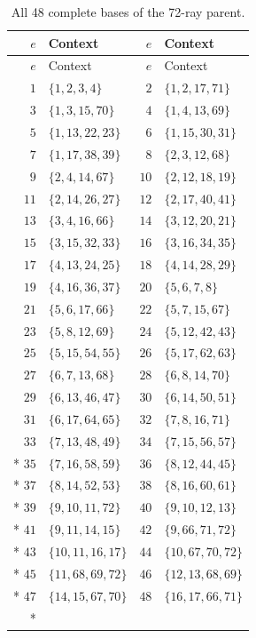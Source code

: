 \documentclass[aps,pra,reprint,superscriptaddress,longbibliography,nofootinbib,floatfix,10pt]{revtex4-2}
\theoremstyle{definition}
\begin{document}
\begin{longtable}{rlrl}
\caption{All 48 complete bases of the 72-ray parent.}\label{tab:parent72-contexts}\\
\toprule
$e$ & Context & $e$ & Context\\\midrule
\endfirsthead
\toprule
$e$ & Context & $e$ & Context\\\midrule
\endhead
\bottomrule\endfoot
$1$ & $\{1,2,3,4\}$ & $2$ & $\{1,2,17,71\}$\\
$3$ & $\{1,3,15,70\}$ & $4$ & $\{1,4,13,69\}$\\
$5$ & $\{1,13,22,23\}$ & $6$ & $\{1,15,30,31\}$\\
$7$ & $\{1,17,38,39\}$ & $8$ & $\{2,3,12,68\}$\\
$9$ & $\{2,4,14,67\}$ & $10$ & $\{2,12,18,19\}$\\
$11$ & $\{2,14,26,27\}$ & $12$ & $\{2,17,40,41\}$\\
$13$ & $\{3,4,16,66\}$ & $14$ & $\{3,12,20,21\}$\\
$15$ & $\{3,15,32,33\}$ & $16$ & $\{3,16,34,35\}$\\
$17$ & $\{4,13,24,25\}$ & $18$ & $\{4,14,28,29\}$\\
$19$ & $\{4,16,36,37\}$ & $20$ & $\{5,6,7,8\}$\\
$21$ & $\{5,6,17,66\}$ & $22$ & $\{5,7,15,67\}$\\
$23$ & $\{5,8,12,69\}$ & $24$ & $\{5,12,42,43\}$\\
$25$ & $\{5,15,54,55\}$ & $26$ & $\{5,17,62,63\}$\\
$27$ & $\{6,7,13,68\}$ & $28$ & $\{6,8,14,70\}$\\
$29$ & $\{6,13,46,47\}$ & $30$ & $\{6,14,50,51\}$\\
$31$ & $\{6,17,64,65\}$ & $32$ & $\{7,8,16,71\}$\\
$33$ & $\{7,13,48,49\}$ & $34$ & $\{7,15,56,57\}$\\*
$35$ & $\{7,16,58,59\}$ & $36$ & $\{8,12,44,45\}$\\*
$37$ & $\{8,14,52,53\}$ & $38$ & $\{8,16,60,61\}$\\*
$39$ & $\{9,10,11,72\}$ & $40$ & $\{9,10,12,13\}$\\*
$41$ & $\{9,11,14,15\}$ & $42$ & $\{9,66,71,72\}$\\*
$43$ & $\{10,11,16,17\}$ & $44$ & $\{10,67,70,72\}$\\*
$45$ & $\{11,68,69,72\}$ & $46$ & $\{12,13,68,69\}$\\*
$47$ & $\{14,15,67,70\}$ & $48$ & $\{16,17,66,71\}$\\*
\end{longtable}
\endgroup
\end{document}
